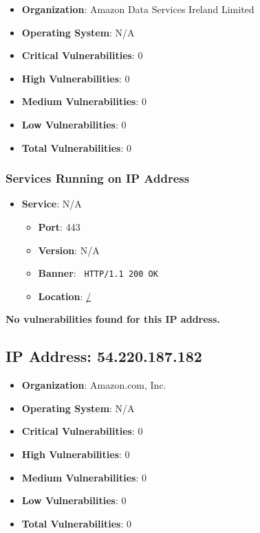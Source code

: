 \documentclass{article}
\begin{document}
\begin{itemize}
    \item \textbf{Organization}: Amazon Data Services Ireland Limited
    \item \textbf{Operating System}:  N/A 
    \item \textbf{Critical Vulnerabilities}: 0
    \item \textbf{High Vulnerabilities}: 0
    \item \textbf{Medium Vulnerabilities}: 0
    \item \textbf{Low Vulnerabilities}: 0
    \item \textbf{Total Vulnerabilities}: 0
\end{itemize}

\subsubsection*{Services Running on IP Address}

\begin{itemize}
    
        \item \textbf{Service}: N/A
        \begin{itemize}
            \item \textbf{Port}: 443
            \item \textbf{Version}:  N/A 
            \item \textbf{Banner}: \texttt{
                HTTP/1.1 200 OK
            }
            \item \textbf{Location}: \href{ / }{ / }
        \end{itemize}
    
\end{itemize}


\textbf{No vulnerabilities found for this IP address.}




\clearpage



\subsection*{IP Address: 54.220.187.182}

\begin{itemize}
    \item \textbf{Organization}: Amazon.com, Inc.
    \item \textbf{Operating System}:  N/A 
    \item \textbf{Critical Vulnerabilities}: 0
    \item \textbf{High Vulnerabilities}: 0
    \item \textbf{Medium Vulnerabilities}: 0
    \item \textbf{Low Vulnerabilities}: 0
    \item \textbf{Total Vulnerabilities}: 0
\end{itemize}
\end{document}
